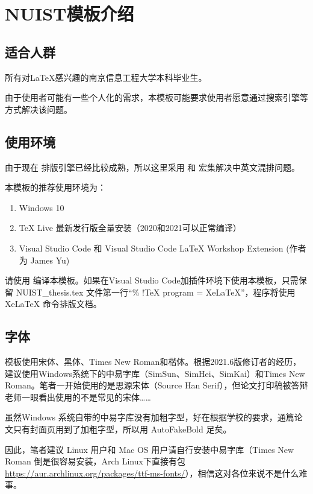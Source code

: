 \section{NUIST模板介绍}

\subsection{适合人群}

所有对\LaTeX 感兴趣的南京信息工程大学本科毕业生。

由于使用者可能有一些个人化的需求，本模板可能要求使用者愿意通过搜索引擎等方式解决该问题。

\subsection{使用环境}

由于现在 \XeTeX 排版引擎已经比较成熟，所以这里采用 \XeLaTeX{} 和 \CTeX{} 宏集解决中英文混排问题。

本模板的推荐使用环境为：

\begin{enumerate}[1、]
    \item Windows 10
    \item TeX Live 最新发行版全量安装（2020和2021可以正常编译）
    \item Visual Studio Code 和 Visual Studio Code LaTeX Workshop Extension (作者为 James Yu)
\end{enumerate}

请使用\XeLaTeX{} 编译本模板。如果在Visual Studio Code加插件环境下使用本模板，只需保留 NUIST\_thesis.tex 文件第一行“\% !TeX program  = XeLaTeX”，程序将使用XeLaTeX 命令排版文档。

\subsection{字体}

模板使用宋体、黑体、Times New Roman和楷体。根据2021.6版修订者的经历，建议使用Windows系统下的中易字库（SimSun、SimHei、SimKai）和Times New Roman。笔者一开始使用的是思源宋体（Source Han Serif），但论文打印稿被答辩老师一眼看出使用的不是常见的宋体……

虽然Windows 系统自带的中易字库没有加粗字型，好在根据学校的要求，通篇论文只有封面页用到了加粗字型，所以用 AutoFakeBold 足矣。

因此，笔者建议 Linux 用户和 Mac OS 用户请自行安装中易字库（Times New Roman 倒是很容易安装，Arch Linux下直接有包 \url{https://aur.archlinux.org/packages/ttf-ms-fonts/}），相信这对各位来说不是什么难事。

